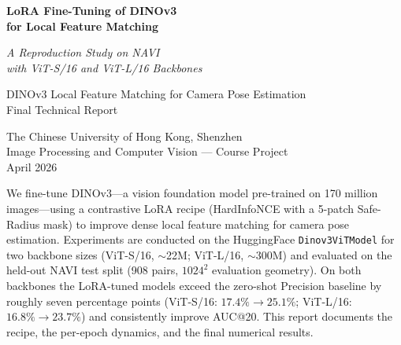 \documentclass[11pt,a4paper]{article}
\begin{document}
\begin{titlepage}
\centering
\vspace*{3.5cm}

{\fontsize{26}{32}\selectfont\bfseries LoRA Fine-Tuning of DINOv3\\[6pt]
for Local Feature Matching\par}
\vspace{10pt}
{\LARGE\itshape A Reproduction Study on NAVI\\[3pt]
with ViT-S/16 and ViT-L/16 Backbones\par}

\vspace{28pt}
{\large DINOv3 Local Feature Matching for Camera Pose Estimation\\[4pt]
Final Technical Report\par}

\vspace{32pt}
{\large The Chinese University of Hong Kong, Shenzhen\\[3pt]
Image Processing and Computer Vision --- Course Project\\[4pt]
April 2026\par}

\vspace{28pt}
\begin{minipage}{0.88\textwidth}
\large
We fine-tune DINOv3---a vision foundation model pre-trained on 170 million images---using a contrastive
LoRA recipe (HardInfoNCE with a 5-patch Safe-Radius mask) to improve dense local feature matching for
camera pose estimation.
Experiments are conducted on the HuggingFace \texttt{Dinov3ViTModel} for two backbone sizes (ViT-S/16,
$\sim$22M; ViT-L/16, $\sim$300M) and evaluated on the held-out NAVI test split (908 pairs, $1024^2$
evaluation geometry).
On both backbones the LoRA-tuned models exceed the zero-shot Precision baseline by roughly seven
percentage points (ViT-S/16: $17.4\% \rightarrow 25.1\%$; ViT-L/16: $16.8\% \rightarrow 23.7\%$) and
consistently improve AUC@20.
This report documents the recipe, the per-epoch dynamics, and the final numerical results.
\end{minipage}
\vfill
\end{titlepage}

\tableofcontents
\newpage

\end{document}
